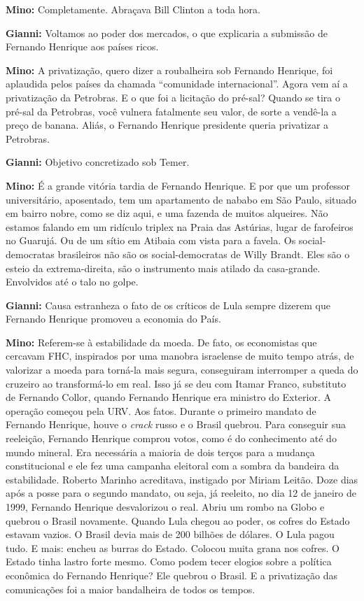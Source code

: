 \textbf{Mino:} Completamente. Abraçava Bill Clinton a toda hora.

\textbf{Gianni:} Voltamos ao poder dos mercados, o que explicaria a
submissão de Fernando Henrique aos países ricos.

\textbf{Mino:} A privatização, quero dizer a roubalheira sob Fernando
Henrique, foi aplaudida pelos países da chamada ``comunidade
internacional''. Agora vem aí a privatização da Petrobras. E o que foi a
licitação do pré-sal? Quando se tira o pré-sal da Petrobras, você
vulnera fatalmente seu valor, de sorte a vendê-la a preço de banana.
Aliás, o Fernando Henrique presidente queria privatizar a Petrobras.

\textbf{Gianni:} Objetivo concretizado sob Temer.

\textbf{Mino:} É a grande vitória tardia de Fernando Henrique. E por que
um professor universitário, aposentado, tem um apartamento de nababo em
São Paulo, situado em bairro nobre, como se diz aqui, e uma fazenda de
muitos alqueires. Não estamos falando em um ridículo triplex na Praia
das Astúrias, lugar de farofeiros no Guarujá. Ou de um sítio em Atibaia
com vista para a favela. Os social-democratas brasileiros não são os
social-democratas de Willy Brandt. Eles são o esteio da extrema-direita,
são o instrumento mais atilado da casa-grande. Envolvidos até o talo no
golpe.

\textbf{Gianni:} Causa estranheza o fato de os críticos de Lula sempre
dizerem que Fernando Henrique promoveu a economia do País.

\textbf{Mino:} Referem-se à estabilidade da moeda. De fato, os
economistas que cercavam FHC, inspirados por uma manobra israelense de
muito tempo atrás, de valorizar a moeda para torná-la mais segura,
conseguiram interromper a queda do cruzeiro ao transformá-lo em real.
Isso já se deu com Itamar Franco, substituto de Fernando Collor, quando
Fernando Henrique era ministro do Exterior. A operação começou pela URV.
Aos fatos. Durante o primeiro mandato de Fernando Henrique, houve o
\emph{crack} russo e o Brasil quebrou. Para conseguir sua reeleição,
Fernando Henrique comprou votos, como é do conhecimento até do mundo
mineral. Era necessária a maioria de dois terços para a mudança
constitucional e ele fez uma campanha eleitoral com a sombra da bandeira
da estabilidade. Roberto Marinho acreditava, instigado por Miriam
Leitão. Doze dias após a posse para o segundo mandato, ou seja, já
reeleito, no dia 12 de janeiro de 1999, Fernando Henrique desvalorizou o
real. Abriu um rombo na Globo e quebrou o Brasil novamente. Quando Lula
chegou ao poder, os cofres do Estado estavam vazios. O Brasil devia mais
de 200 bilhões de dólares. O Lula pagou tudo. E mais: encheu as burras
do Estado. Colocou muita grana nos cofres. O Estado tinha lastro forte
mesmo. Como podem tecer elogios sobre a política econômica do Fernando
Henrique? Ele quebrou o Brasil. E a privatização das comunicações foi a
maior bandalheira de todos os tempos.

